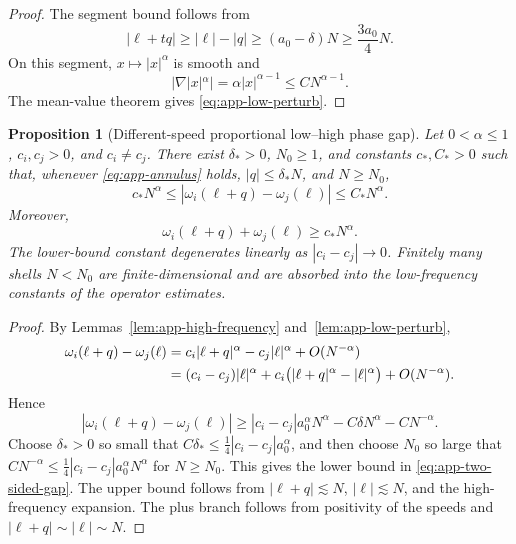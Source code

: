\documentclass[10pt]{amsart}
\numberwithin{equation}{section}
\theoremstyle{plain}
\newtheorem{proposition}[theorem]{Proposition}
\theoremstyle{definition}
\theoremstyle{remark}
\begin{document}
\begin{proof}
The segment bound follows from
\[
 |\ell+tq|\ge |\ell|-|q|\ge (a_0-\delta)N\ge \frac{3a_0}{4}N.
\]
On this segment, $x\mapsto |x|^\alpha$ is smooth and
\[
 |\nabla |x|^\alpha|=\alpha |x|^{\alpha-1}\le C N^{\alpha-1}.
\]
The mean-value theorem gives \eqref{eq:app-low-perturb}.
\end{proof}

\begin{proposition}[Different-speed proportional low--high phase gap]\label{prop:phase-gap-annulus}
Let $0<\alpha\le 1$, $c_i,c_j>0$, and $c_i\ne c_j$.  There exist $\delta_*>0$, $N_0\ge1$, and constants $c_*,C_*>0$ such that, whenever \eqref{eq:app-annulus} holds, $|q|\le\delta_*N$, and $N\ge N_0$,
\begin{equation}\label{eq:app-two-sided-gap}
 c_*N^\alpha\le |\omega_i(\ell+q)-\omega_j(\ell)|\le C_*N^\alpha.
\end{equation}
Moreover,
\begin{equation}\label{eq:app-plus-gap}
 \omega_i(\ell+q)+\omega_j(\ell)\ge c_*N^\alpha.
\end{equation}
The lower-bound constant degenerates linearly as $|c_i-c_j|\to0$.  Finitely many shells $N<N_0$ are finite-dimensional and are absorbed into the low-frequency constants of the operator estimates.
\end{proposition}

\begin{proof}
By Lemmas~\ref{lem:app-high-frequency} and~\ref{lem:app-low-perturb},
\begin{align}
 \omega_i(\ell+q)-\omega_j(\ell)
 &=c_i|\ell+q|^\alpha-c_j|\ell|^\alpha+O(N^{-\alpha})  \notag\\
 &=(c_i-c_j)|\ell|^\alpha+c_i\bigl(|\ell+q|^\alpha-|\ell|^\alpha\bigr)+O(N^{-\alpha}). \label{eq:app-gap-expansion}
\end{align}
Hence
\[
 |\omega_i(\ell+q)-\omega_j(\ell)|
 \ge |c_i-c_j|a_0^\alpha N^\alpha-C\delta N^\alpha-CN^{-\alpha}.
\]
Choose $\delta_*>0$ so small that $C\delta_*\le \frac14|c_i-c_j|a_0^\alpha$, and then choose $N_0$ so large that $CN^{-\alpha}\le \frac14|c_i-c_j|a_0^\alpha N^\alpha$ for $N\ge N_0$.  This gives the lower bound in \eqref{eq:app-two-sided-gap}.  The upper bound follows from $|\ell+q|\lesssim N$, $|\ell|\lesssim N$, and the high-frequency expansion.  The plus branch follows from positivity of the speeds and $|\ell+q|\sim |\ell|\sim N$.
\end{proof}
\end{document}
